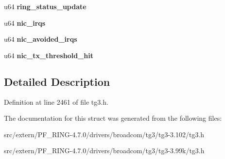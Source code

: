 \begin{DoxyCompactItemize}
\item 
\hypertarget{structtg3__ethtool__stats_aa9951120a19c583856ff32b9d46835ae}{
u64 {\bfseries ring\_\-status\_\-update}}
\label{structtg3__ethtool__stats_aa9951120a19c583856ff32b9d46835ae}

\item 
\hypertarget{structtg3__ethtool__stats_ab8778a275ef120e298bf5a0995d37359}{
u64 {\bfseries nic\_\-irqs}}
\label{structtg3__ethtool__stats_ab8778a275ef120e298bf5a0995d37359}

\item 
\hypertarget{structtg3__ethtool__stats_a28552a946614bee970e580e566aa06a1}{
u64 {\bfseries nic\_\-avoided\_\-irqs}}
\label{structtg3__ethtool__stats_a28552a946614bee970e580e566aa06a1}

\item 
\hypertarget{structtg3__ethtool__stats_a0b017ab270571efd1f428b9f6793da49}{
u64 {\bfseries nic\_\-tx\_\-threshold\_\-hit}}
\label{structtg3__ethtool__stats_a0b017ab270571efd1f428b9f6793da49}

\end{DoxyCompactItemize}


\subsection{Detailed Description}


Definition at line 2461 of file tg3.h.



The documentation for this struct was generated from the following files:\begin{DoxyCompactItemize}
\item 
src/extern/PF\_\-RING-\/4.7.0/drivers/broadcom/tg3/tg3-\/3.102/tg3.h\item 
src/extern/PF\_\-RING-\/4.7.0/drivers/broadcom/tg3/tg3-\/3.99k/tg3.h\end{DoxyCompactItemize}
